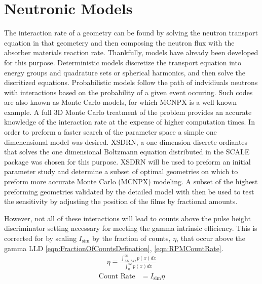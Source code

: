\section{Neutronic Models}
The interaction rate of a geometry can be found by solving the neutron transport equation in that geometery and then composing the neutron flux with the absorber materials reaction rate.
Thankfully, models have already been developed for this purpose.
Deterministic models discretize the transport equation into energy groups and quadrature sets or spherical harmonics, and then solve the discritized equations.
Probabilistic models follow the path of indvidiuals neutrons with interactions based on the probability of a given event occuring.
Such codes are also known as Monte Carlo models, for which MCNPX is a well known example.
A full 3D Monte Carlo treatment of the problem provides an accurate knowledge of the interaction rate at the expense of higher computation times. 
In order to preform a faster search of the parameter space a simple one dimenensional model was desired.
XSDRN, a one dimension discrete ordiantes that solves the one dimensional Boltzmann equation distributed in the SCALE package was chosen for this purpose.
XSDRN will be used to preform an initial parameter study and determine a subset of optimal geometries on which to preform more accurate Monte Carlo (MCNPX) modeling. 
A subset of the highest preforming geometries validated by the detailed model with then be used to test the sensitivity by adjusting the position of the films by fractional amounts.



However, not all of these interactions will lead to counts above the pulse height discriminator setting necessary for meeting the gamma intrinsic efficiency.
This is corrected for by scaling $I_{\text{sim}}$ by the fraction of counts, $\eta$, that occur above the gamma LLD \eqref{eqn:FractionOfCountsDefination}, \eqref{eqn:RPMCountRate}.
\begin{align}
  \label{eqn:FractionOfCountsDefination}
  \eta \equiv \frac{\int_{MLLD}^\infty p(x)dx}{\int_0^\infty p(x)dx}
\end{align}
\begin{align}
 \label{eqn:RPMCountRate}
 \text{Count Rate} &= I_{\text{sim}} \eta
\end{align}

